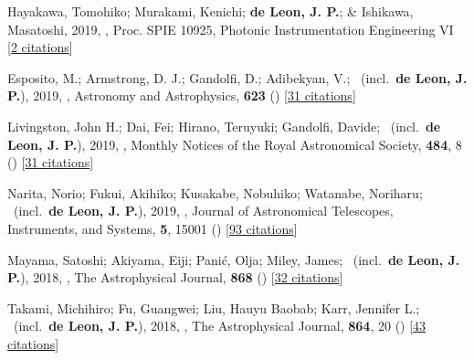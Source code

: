 \item[{\color{numcolor}\scriptsize11}] Hayakawa, Tomohiko; Murakami, Kenichi; \textbf{de Leon, J. P.}; \& Ishikawa, Masatoshi, 2019, , Proc. SPIE 10925, Photonic Instrumentation Engineering VI [\href{https://www.spiedigitallibrary.org/conference-proceedings-of-spie/10925/1092507/Focus-adjustable-motion-blur-compensation-method-using-deformable-mirror/10.1117/12.2509567.short}{2 citations}]

\item[{\color{numcolor}\scriptsize10}] Esposito, M.; Armstrong, D. J.; Gandolfi, D.; Adibekyan, V.; \etal\ (incl.\ \textbf{de Leon, J. P.}), 2019, , Astronomy and Astrophysics, \textbf{623} () [\href{https://ui.adsabs.harvard.edu/abs/2019A&A...623A.165E}{31 citations}]

\item[{\color{numcolor}\scriptsize9}] Livingston, John H.; Dai, Fei; Hirano, Teruyuki; Gandolfi, Davide; \etal\ (incl.\ \textbf{de Leon, J. P.}), 2019, , Monthly Notices of the Royal Astronomical Society, \textbf{484}, 8 () [\href{https://ui.adsabs.harvard.edu/abs/2019MNRAS.484....8L}{31 citations}]

\item[{\color{numcolor}\scriptsize8}] Narita, Norio; Fukui, Akihiko; Kusakabe, Nobuhiko; Watanabe, Noriharu; \etal\ (incl.\ \textbf{de Leon, J. P.}), 2019, , Journal of Astronomical Telescopes, Instruments, and Systems, \textbf{5}, 15001 () [\href{https://ui.adsabs.harvard.edu/abs/2019JATIS...5a5001N}{93 citations}]

\item[{\color{numcolor}\scriptsize7}] Mayama, Satoshi; Akiyama, Eiji; Pani{\'c}, Olja; Miley, James; \etal\ (incl.\ \textbf{de Leon, J. P.}), 2018, , The Astrophysical Journal, \textbf{868} () [\href{https://ui.adsabs.harvard.edu/abs/2018ApJ...868L...3M}{32 citations}]

\item[{\color{numcolor}\scriptsize6}] Takami, Michihiro; Fu, Guangwei; Liu, Hauyu Baobab; Karr, Jennifer L.; \etal\ (incl.\ \textbf{de Leon, J. P.}), 2018, , The Astrophysical Journal, \textbf{864}, 20 () [\href{https://ui.adsabs.harvard.edu/abs/2018ApJ...864...20T}{43 citations}]

